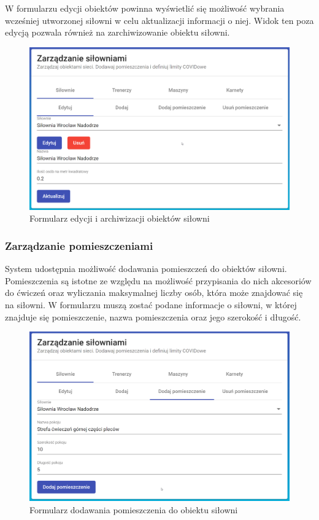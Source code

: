 \documentclass[a4paper,twoside,12pt]{book}
\begin{document}
{\newpage
W formularzu edycji obiektów powinna wyświetlić się możliwość wybrania wcześniej utworzonej siłowni w celu aktualizacji informacji o niej. Widok ten poza edycją pozwala również na zarchiwizowanie obiektu siłowni.
\begin{figure}[h!]
	\centering
	\includegraphics[width=1\linewidth]{../zrzuty_ekranu/dzialanie/obiekty/edycja}
	\caption{Formularz edycji i archiwizacji obiektów siłowni}
	\label{fig:edycja}
\end{figure}
\FloatBarrier


\subsubsection{Zarządzanie pomieszczeniami}
System udostępnia możliwość dodawania pomieszczeń do obiektów siłowni. Pomieszczenia są istotne ze względu na możliwość przypisania do nich akcesoriów do ćwiczeń oraz wyliczania maksymalnej liczby osób, która może znajdować się na siłowni. W formularzu muszą zostać podane informacje o siłowni, w której znajduje się pomieszczenie, nazwa pomieszczenia oraz jego szerokość i długość.
\begin{figure}[h!]
	\centering
	\includegraphics[width=1\linewidth]{../zrzuty_ekranu/dzialanie/pomieszczenia/dodawanie}
	\caption{Formularz dodawania pomieszczenia do obiektu siłowni}
	\label{fig:dodawanie_pomieszczenia}
\end{figure}
\FloatBarrier

}
\end{document}
